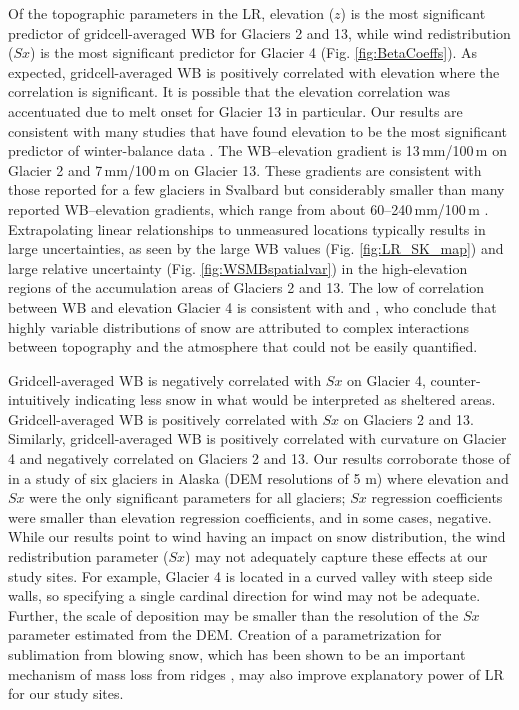 \documentclass[twocolumn, letterpaper]{igs}
\begin{document}
Of the topographic parameters in the LR, elevation ($z$) is the most significant predictor of gridcell-averaged WB for Glaciers 2 and 13, while wind redistribution ($Sx$) is the most significant predictor for Glacier 4 (Fig. \ref{fig:BetaCoeffs}). As expected, gridcell-averaged WB is positively correlated with elevation where the correlation is significant. It is possible that the elevation correlation was accentuated due to melt onset for Glacier 13 in particular. Our results are consistent with many studies that have found elevation to be the most significant predictor of winter-balance data \citep[e.g.][]{Machguth2006, McGrath2015}. The WB--elevation gradient is 13\,mm/100\,m on Glacier 2 and 7\,mm/100\,m on Glacier 13. These gradients are consistent with those reported for a few glaciers in Svalbard \citep{Winther1998} but considerably smaller than many reported WB--elevation gradients, which range from about 60--240\,mm/100\,m \citep[e.g.][]{Hagen1990,Tveit1996,Winther1998}. Extrapolating linear relationships to unmeasured locations typically results in large uncertainties, as seen by the large WB values (Fig. \ref{fig:LR_SK_map}) and large relative uncertainty (Fig. \ref{fig:WSMBspatialvar}) in the high-elevation regions of the accumulation areas of Glaciers 2 and 13. The low of correlation between WB and elevation Glacier 4 is consistent with \cite{Grabiec2011} and \cite{Lopez2011}, who conclude that highly variable distributions of snow are attributed to complex interactions between topography and the atmosphere that could not be easily quantified. 

Gridcell-averaged WB is negatively correlated with $Sx$ on Glacier 4, counter-intuitively indicating less snow in what would be interpreted as sheltered areas. Gridcell-averaged WB is positively correlated with $Sx$ on Glaciers 2 and 13. Similarly, gridcell-averaged WB is positively correlated with curvature on Glacier 4 and negatively correlated on Glaciers 2 and 13. Our results corroborate those of \cite{McGrath2015} in a study of six glaciers in Alaska (DEM resolutions of 5 m) where elevation and $Sx$ were the only significant parameters for all glaciers; $Sx$ regression coefficients were smaller than elevation regression coefficients, and in some cases, negative. While our results point to wind having an impact on snow distribution, the wind redistribution parameter ($Sx$) may not adequately capture these effects at our study sites. For example, Glacier 4 is located in a curved valley with steep side walls, so specifying a single cardinal direction for wind may not be adequate. Further, the scale of deposition may be smaller than the resolution of the $Sx$ parameter estimated from the DEM. Creation of a parametrization for sublimation from blowing snow, which has been shown to be an important mechanism of mass loss from ridges \citep[e.g.][]{Musselman2015}, may also improve explanatory power of LR for our study sites.
\end{document}
